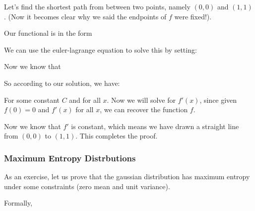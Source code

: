 \documentclass[12pt]{article}
\begin{document}
Let's find the shortest path from between two points, namely $(0,0)$ and $(1,1)$. (Now it becomes clear why we said the endpoints of $f$ were fixed!).

Our functional is in the form


We can use the euler-lagrange equation to solve this by setting:


Now we know that

So according to our solution, we have:

For some constant $C$ and for all $x$. Now we will solve for $f'(x)$, since given $f(0) = 0$ and $f'(x)$ for all $x$, we can recover the function $f$.


Now we know that $f'$ is constant, which means we have drawn a straight line from $(0,0)$ to $(1,1)$. This completes the proof.

\subsubsection{Maximum Entropy Distrbutions}

As an exercise, let us prove that the gaussian distribution has maximum entropy under some constraints (zero mean and unit variance). 

Formally, 
\end{document}
